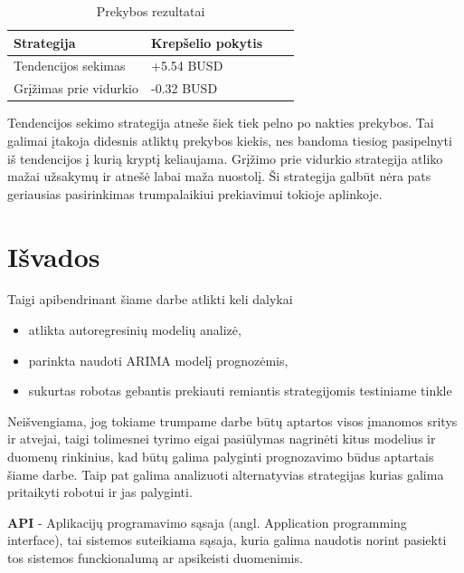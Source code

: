 \documentclass{VUMIFInfKursinis}
\begin{document}
\begin{table}[H]
  \centering
  \begin{tabularx}{\linewidth}{|X|X|X|X|}
    \hline
    Strategija             & Krepšelio pokytis \\
    \hline
    Tendencijos sekimas    & +5.54 BUSD        \\
    \hline
    Grįžimas prie vidurkio & -0.32 BUSD        \\
    \hline
  \end{tabularx}
  \caption{Prekybos rezultatai}
  \label{table:preykos_rezultatai}
\end{table}

Tendencijos sekimo strategija atneše šiek tiek pelno po nakties prekybos. Tai galimai įtakoja didesnis atliktų prekybos kiekis, nes bandoma tiesiog pasipelnyti iš tendencijos į kurią kryptį keliaujama. Grįžimo prie vidurkio strategija atliko 
mažai užsakymų ir atnešė labai maža nuostolį. Ši strategija galbūt nėra pats geriausias pasirinkimas trumpalaikiui prekiavimui
tokioje aplinkoje.

\section{Išvados}
Taigi apibendrinant šiame darbe atlikti keli dalykai
\begin{itemize}
  \item atlikta autoregresinių modelių analizė,
  \item parinkta naudoti ARIMA modelį prognozėmis,
  \item sukurtas robotas gebantis prekiauti remiantis strategijomis testiniame tinkle
\end{itemize}

Neišvengiama, jog tokiame trumpame darbe būtų aptartos visos įmanomos sritys ir atvejai, taigi tolimesnei tyrimo eigai pasiūlymas nagrinėti kitus modelius
ir duomenų rinkinius, kad būtų galima palyginti prognozavimo būdus aptartais šiame darbe. Taip pat galima analizuoti alternatyvias strategijas kurias galima
pritaikyti robotui ir jas palyginti. 


\textbf{API} - Aplikacijų programavimo sąsaja (angl. Application programming interface), tai sistemos suteikiama sąsaja, kuria galima naudotis norint pasiekti tos sistemos
funckionalumą ar apsikeisti duomenimis.
\end{document}
